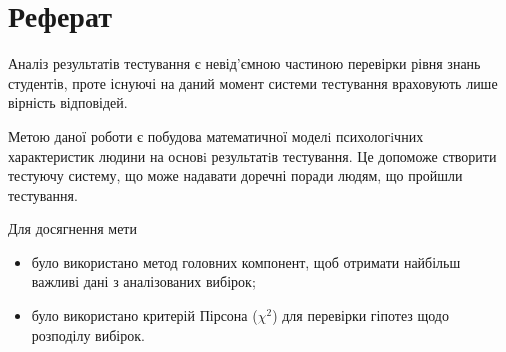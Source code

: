 \chapter*{Реферат}

Аналіз результатів тестування є невід’ємною частиною перевірки рівня знань
студентів, проте існуючі на даний момент системи тестування враховують
лише вірність відповідей.

Метою даної роботи є побудова математичної моделi психологiчних характеристик
людини на основi результатiв тестування.
Це допоможе створити тестуючу систему, що може надавати доречні поради людям,
що пройшли тестування.

Для досягнення мети
\begin{itemize}
  \item 
    було використано метод головних компонент,
    щоб отримати найбільш важливі дані з аналізованих вибірок;
  \item
    було використано критерій Пірсона ($\chi^2$) для перевірки гіпотез щодо
    розподілу вибірок.
\end{itemize}


